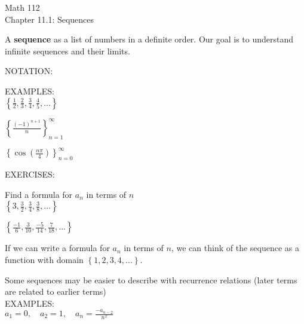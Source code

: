 \documentclass[11pt]{article}
\begin{document}
\begin{center}
\Large
\rm{Math 112}
\\
\rm{Chapter 11.1:  Sequences}
\\
\end{center}
\vspace{0.2in}


A {\bf sequence} as a list of numbers in a definite order.  Our goal is to understand infinite sequences and their limits.

\vspace{0.7in}

NOTATION:

\vspace{0.7in}


EXAMPLES:\\


$\left\{\frac12, \frac23, \frac34, \frac45, ... \right\}$

\vspace{0.7in}

$\left\{\frac{(-1)^{n+1}}{n} \right\}_{n=1}^{\infty}$

\vspace{0.7in}

$\left\{\cos{\left(\frac{n\pi}{4}\right)} \right\}_{n=0}^{\infty}$

\vspace{0.7in}

EXERCISES:

Find a formula for $a_n$ in terms of $n$\\

$\left\{3, \frac32, \frac34, \frac38,  ... \right\}$

\vspace{0.7in}

$\left\{\frac{-1}{6}, \frac{3}{10}, \frac{-5}{14}, \frac{7}{18}, ... \right\}$

\pagebreak

If we can write a formula for $a_n$ in terms of $n$, we can think of the sequence as a function with domain $\left\{1, 2, 3, 4,  ... \right\}$.

\vspace{2in}


Some sequences may be easier to describe with recurrence relations (later terms are related to earlier terms)\\

EXAMPLES:\\

$a_1= 0, \quad a_2=1, \quad a_n=\frac{-a_{n-2}}{n^2}$
\end{document}
